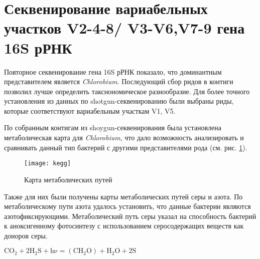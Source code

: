 \section{Секвенирование вариабельных участков V2-4-8/ V3-V6,V7-9 гена 16S рРНК} \label{sect2_2}


Повторное секвенирование гена 16S рРНК показало, что доминантным представителем является \textit{Chlorobium}. Последующий сбор ридов в контиги позволил лучше определить такснономическое разнообразие. Для более точного установления из данных по shotgun-секвенированию были выбраны риды, которые соответствуют вариабельным участкам V1, V5. 

По собранным контигам из shoygun-секвенирования была установлена метаболическая карта для \textit{Chlorobium}, что дало возможность анализировать и сравнивать данный тип бактерий с другими представителями рода (см. рис. \ref{img:kegg}). 


\begin{figure}[h]
  \texttt{[image: kegg]}
  \centering
  \caption{Карта метаболических путей}
  \label{img:kegg}  
\end{figure}



Также для них были получены карты метаболических путей серы и азота. По метаболическому пути азота удалось установить, что данные бактерии являются азотофиксирующими. Метаболический путь серы указал на способность бактерий к аноксигенному фотосинтезу с использованием серосодержащих веществ как доноров серы. 

\center $\mathrm{C O_2 + 2H_2 S + h\nu = (C H_2 O) + H_2 O + 2 S}$


\clearpage
